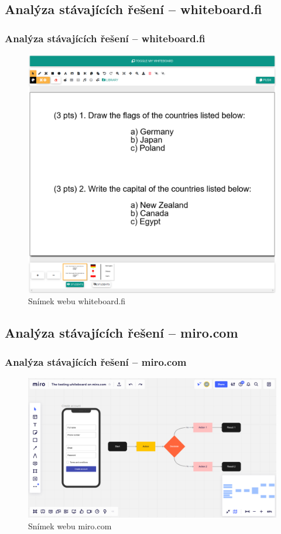 \documentclass{beamer}
\begin{document}
\subsection{Analýza stávajících řešení -- whiteboard.fi}
\begin{frame}
    \frametitle{Analýza stávajících řešení -- whiteboard.fi}
    \begin{figure}
        \centering
        \includegraphics[height=0.7\paperheight]{Figures/whiteboard.png}
        \caption{Snímek webu whiteboard.fi}
    \end{figure}
\end{frame}

\subsection{Analýza stávajících řešení -- miro.com}
\begin{frame}
    \frametitle{Analýza stávajících řešení -- miro.com}
    \begin{figure}
        \centering
        \includegraphics[width=1\textwidth]{Figures/miro.png}
        \caption{Snímek webu miro.com}
    \end{figure}
\end{frame}
\end{document}
